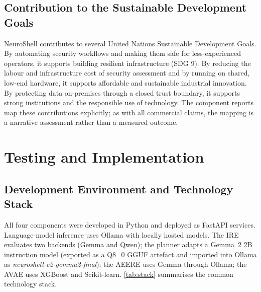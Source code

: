 \subsection{Contribution to the Sustainable Development Goals}\label{sec:commercial-sdg}

NeuroShell contributes to several United Nations Sustainable Development Goals.
By automating security workflows and making them safe for less-experienced
operators, it supports building resilient infrastructure (SDG 9). By reducing
the labour and infrastructure cost of security assessment and by running on
shared, low-end hardware, it supports affordable and sustainable industrial
innovation. By protecting data on-premises through a closed trust boundary, it
supports strong institutions and the responsible use of technology. The
component reports map these contributions explicitly; as with all commercial
claims, the mapping is a narrative assessment rather than a measured outcome.

\section{Testing and Implementation}\label{sec:testing}

\subsection{Development Environment and Technology Stack}\label{sec:testing-stack}

All four components were developed in Python and deployed as FastAPI services.
Language-model inference uses Ollama with locally hosted models. The IRE
evaluates two backends (Gemma and Qwen); the planner adapts a Gemma~2 2B
instruction model (exported as a Q8\_0 GGUF artefact and imported into Ollama as
\emph{neuroshell-c2-gemma2-final}); the AEERE uses Gemma through Ollama; the
AVAE uses XGBoost and Scikit-learn. \cref{tab:stack} summarises the common
technology stack.

